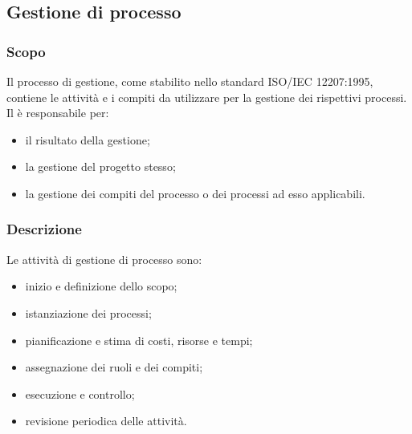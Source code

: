 \subsection{Gestione di processo}

\subsubsection{Scopo}
Il processo di gestione, come stabilito nello standard ISO/IEC 12207:1995, contiene le attività e i compiti da utilizzare per la gestione dei rispettivi processi.\\
Il \respProg{} è responsabile per:
\begin{itemize}
\item il risultato della gestione;
\item la gestione del progetto stesso;
\item la gestione dei compiti del processo o dei processi ad esso applicabili.
\end{itemize}

\subsubsection{Descrizione}
Le attività di gestione di processo sono:
\begin{itemize}
\item inizio e definizione dello scopo;
\item istanziazione dei processi;
\item pianificazione e stima di costi, risorse e tempi;
\item assegnazione dei ruoli e dei compiti;
\item esecuzione e controllo;
\item revisione periodica delle attività.
\end{itemize}



